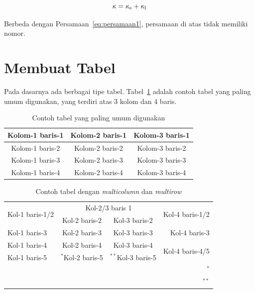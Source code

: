 \begin{displaymath}
    \kappa = \kappa_{\rm e} + \kappa_{\rm l}
\end{displaymath}

\noindent Berbeda dengan Persamaan~\ref{eq:persamaan1}, persamaan di atas tidak memiliki nomor.


\section{Membuat Tabel}

Pada dasarnya ada berbagai tipe tabel. Tabel~\ref{tab:tabel1} adalah contoh tabel yang paling umum digunakan, yang terdiri atas 3 kolom dan 4 baris.

\begin{table}[ht] %
	\centering
	\caption{Contoh tabel yang paling umum digunakan}
	\label{tab:tabel1}
	\begin{tabular}{c c c} %
		\hline
		Kolom-1 baris-1   & Kolom-2 baris-1   & Kolom-3 baris-1 \\
		\hline
		Kolom-1 baris-2   & Kolom-2 baris-2   & Kolom-3 baris-2 \\
		Kolom-1 baris-3   & Kolom-2 baris-3   & Kolom-3 baris-3 \\
		Kolom-1 baris-4   & Kolom-2 baris-4   & Kolom-3 baris-4 \\
		\hline
	\end{tabular}
\end{table}

\begin{table} %
	\centering
	\caption{Contoh tabel dengan \textit{multicolumn} dan \textit{multirow}}
	\label{tab:multitab}
	\begin{tabular}{l c c r} %
		\hline
		\multirow{2}{*}{Kol-1 baris-1/2}  & \multicolumn{2}{c}{Kol-2/3 baris 1}  & \multirow{2}{*}{Kol-4 baris-1/2} \\
		                                  & Kol-2 baris-2                        & Kol-3 baris-2   & \\
		\hline
		Kol-1 baris-3  & Kol-2 baris-3    & Kol-3 baris-3   & Kol-4 baris-3 \\
		Kol-1 baris-4  & Kol-2 baris-4    & Kol-3 baris-4   & \multirow{2}{*}{Kol-4 baris-4/5} \\
		Kol-1 baris-5  & $^*$Kol-2 baris-5    & $^{**}$Kol-3 baris-5   & \\		                                  
		\hline
		\multicolumn{4}{r}{$^*$\citealt{refJurnal}} \\ %
		\multicolumn{4}{r}{$^{**}$\citealt{refProceedings}} %
	\end{tabular}
\end{table}

